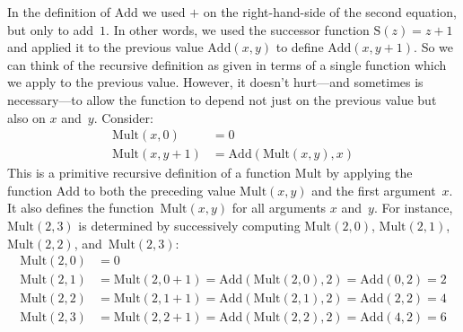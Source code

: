 \documentclass[10pt,a4paper]{article}
\theoremstyle{plain}
\theoremstyle{definition}
\theoremstyle{remark}
\providecommand{\Mult}{\ensuremath{\mathrm{Mult}}}
\providecommand{\Add}{\ensuremath{\mathrm{Add}}}
\providecommand{\Succ}{\ensuremath{\mathrm{S}}}
\begin{document}
In the definition of $\Add$ we used $+$ on the right-hand-side of
the second equation, but only to add~$1$. In other words, we used the
successor function $\Succ(z) = z+1$ and applied it to the previous value
$\Add(x,y)$ to define $\Add(x,y+1)$. So we can think of the
recursive definition as given in terms of a single function which we
apply to the previous value. However, it doesn't hurt---and sometimes
is necessary---to allow the function to depend not just on the previous
value but also on $x$ and~$y$. Consider:
\begin{align*}
  \Mult(x,0) & =  0 \\
  \Mult(x,y+1) & =  \Add(\Mult(x,y),x)
\end{align*}
This is a primitive recursive definition of a function $\Mult$ by
applying the function $\Add$ to both the preceding value
$\Mult(x,y)$ and the first argument~$x$. It also defines the
function~$\Mult(x,y)$ for all arguments $x$ and~$y$. For instance,
$\Mult(2,3)$ is determined by successively computing $\Mult(2,0)$,
$\Mult(2,1)$, $\Mult(2,2)$, and~$\Mult(2,3)$:
\begin{align*}
  \Mult(2,0) & = 0\\
  \Mult(2,1) & = \Mult(2,0+1) =
  \Add(\Mult(2,0), 2) = \Add(0, 2) = 2\\
  \Mult(2,2) & = \Mult(2,1+1) =
  \Add(\Mult(2,1), 2) = \Add(2, 2) = 4\\
  \Mult(2,3) & = \Mult(2,2+1) =
  \Add(\Mult(2,2), 2) = \Add(4, 2) = 6
\end{align*}
\end{document}
